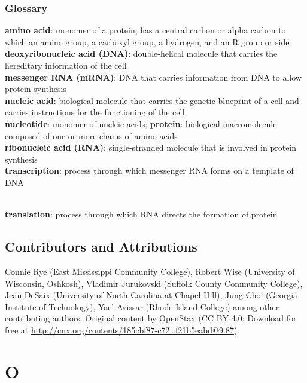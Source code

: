 \documentclass[
]{book}
\begin{document}
\hypertarget{glossary}{%
\subsection{Glossary}\label{glossary}}

\textbf{amino acid}: monomer of a protein; has a central carbon or alpha
carbon to which an amino group, a carboxyl group, a hydrogen, and an R
group or side \textbf{deoxyribonucleic acid (DNA)}: double-helical molecule
that carries the hereditary information of the cell\\
\textbf{messenger RNA (mRNA)}: DNA that carries information from DNA to allow
protein synthesis\\
\textbf{nucleic acid}: biological molecule that carries the genetic blueprint
of a cell and carries instructions for the functioning of the cell\\
\textbf{nucleotide}: monomer of nucleic acids; \textbf{protein}: biological
macromolecule composed of one or more chains of amino acids\\
\textbf{ribonucleic acid (RNA)}: single-stranded
molecule that is involved in protein synthesis\\

\textbf{transcription}: process through which messenger RNA forms on a
template of DNA\\
\strut \\
\textbf{translation}: process through which RNA directs the formation of
protein

\hypertarget{contributors-and-attributions}{%
\section{Contributors and Attributions}\label{contributors-and-attributions}}

Connie Rye (East Mississippi Community College), Robert Wise (University
of Wisconsin, Oshkosh), Vladimir Jurukovski (Suffolk County Community
College), Jean DeSaix (University of North Carolina at Chapel Hill),
Jung Choi (Georgia Institute of Technology), Yael Avissar (Rhode Island
College) among other contributing authors. Original content by OpenStax
(CC BY 4.0; Download for free at
\href{http://cnx.org/contents/185cbf87-c72e-48f5-b51e-f14f21b5eabd\%409.87}{http://cnx.org/contents/185cbf87-c72\ldots f21b5eabd@9.87}).

\hypertarget{o}{%
\chapter{O}\label{o}}
\end{document}

